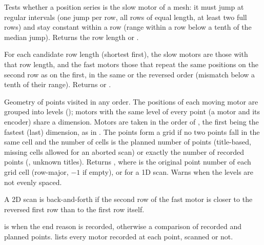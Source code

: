 Tests whether a position series is the slow motor of a mesh: it must jump at regular
intervals (one jump per row, all rows of equal length, at least two full rows) and stay
constant within a row (range within a row below a tenth of the median jump). Returns the row
length or .

For each candidate row length (shortest first), the slow motors are those with that row
length, and the fast motors those that repeat the same positions on the second row as on
the first, in the same or the reversed order (mismatch below a tenth of their range).
Returns  or .

Geometry of points visited in any order. The positions of each moving motor are grouped into
levels (); motors with the same level of every point (a motor and its
encoder) share a dimension. Motors are taken in the order of , the first being the
fastest (last) dimension, as in . The points form a grid if no two points fall in
the same cell and the number of cells is the planned number of points (title-based, missing
cells allowed for an aborted scan) or exactly the number of recorded points
(, unknown titles). Returns , where
 is the original point number of each grid cell (row-major, $-1$ if empty),
or  for a 1D scan. Warns when the levels are not evenly spaced.

A 2D scan is back-and-forth if the second row of the fast motor is closer to the reversed
first row than to the first row itself.

 is  when the end reason is recorded, otherwise
a comparison of recorded and planned points.  lists every motor
recorded at each point, scanned or not.

